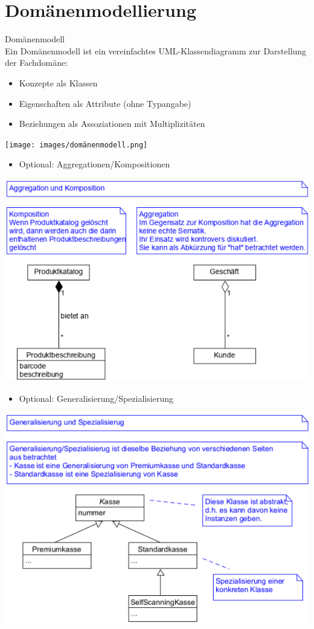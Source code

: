 \section{Domänenmodellierung}

\begin{definition}{Domänenmodell}\\
Ein Domänenmodell ist ein vereinfachtes UML-Klassendiagramm zur Darstellung der Fachdomäne:
\begin{itemize}
    \item Konzepte als Klassen
    \item Eigenschaften als Attribute (ohne Typangabe)
    \item Beziehungen als Assoziationen mit Multiplizitäten
\end{itemize}
\texttt{[image: images/domänenmodell.png]}
\begin{itemize}
    \item Optional: Aggregationen/Kompositionen
\end{itemize}
\includegraphics[width=\linewidth]{images/aggregation_komposition.png}
\begin{itemize}
    \item Optional: Generalisierung/Spezialisierung
\end{itemize}
\includegraphics[width=\linewidth]{images/gener_spez.png}
\end{definition}

